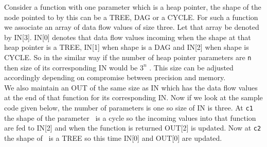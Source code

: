 \begin{example}
Consider a function with one parameter which is a heap pointer, the shape of the node pointed to by this can be a TREE, DAG or a CYCLE. For 
such a function we associate an array of data flow values of size three. Let that array be denoted by IN[3]. IN[0] denotes that data flow values 
incoming when the shape at that heap pointer is  a TREE, IN[1] when shape is a DAG and IN[2] when shape is CYCLE. So in the similar way if the 
number of heap pointer parameters are {\tt n} then size of its corresponding IN would be $3^n$ . This size can be adjusted accordingly 
depending on compromise between precision and memory.\\

We also maintain an OUT of the same size as IN which has the data flow values at the end of that function for its corresponding IN.
Now if we look at the sample code given below, the number of parameters is one so size of IN is three. At {\tt c1} the shape of the parameter \p\ 
is a cycle so the incoming values into that function are fed to IN[2] and when the function is returned OUT[2] is updated. Now at {\tt c2} the shape of 
\p\ is a TREE so this time IN[0] and OUT[0] are updated.
\end{example}

